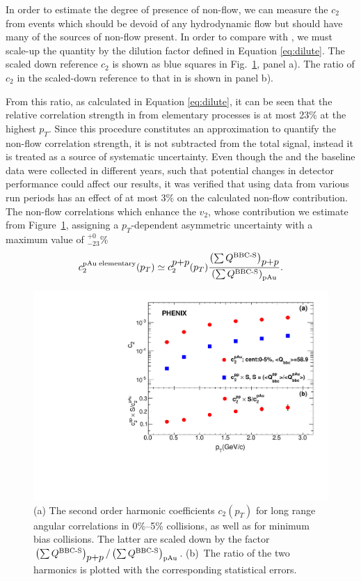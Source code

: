 In order to estimate the degree of presence of non-flow, we can measure the $c_2$ from \pp events which should be devoid of any hydrodynamic flow but should have many of the sources of non-flow present. In order to compare \pp with \pau, we must scale-up the \pp quantity by the dilution factor defined in Equation \ref{eq:dilute}. The scaled down reference $c_{2}$ is shown as blue squares in Fig.~\ref{fig:non_flow}, panel a). The ratio of $c_2$ in the scaled-down \pp reference to that in \pau is shown in panel b). 

From this ratio, as calculated in Equation \ref{eq:dilute}, it can be seen that the relative correlation strength in \pau from elementary processes is at most 23$\%$ at the highest $p_T$. Since this procedure constitutes an approximation to quantify the non-flow correlation strength, it is not subtracted from the total signal, instead it is treated as a source of systematic uncertainty. Even though the \pau and the \pp baseline data were collected in different years, such that potential changes in detector performance could affect our results, it was verified that using \pp data from various run periods has an effect of at most 3$\%$ on the calculated non-flow contribution. The non-flow correlations which enhance the $v_2$, whose contribution we estimate from Figure~\ref{fig:non_flow}, assigning a $p_T$-dependent asymmetric uncertainty with a maximum value of $^{+0}_{-23}\%$
\begin{equation}
c_{2}^{{\rm pAu \; elementary}}(p_{T}) \simeq c_{2}^{\mbox{$p$+$p$}}(p_{T})
\frac{\left( \sum Q^{{\rm \text{BBC-S}}} \right)_{\mbox{$p$+$p$}}}
{\left( \sum Q^{{\rm \text{BBC-S}}} \right)_{{\rm pAu}}}.
\label{eq:dilute}
\end{equation}

\begin{figure}[!h]
\begin{center}
\includegraphics[width=0.6\linewidth]{figs/non_flow.pdf}
\caption{(a) The second order harmonic coefficients $c_2(p_T)$ for long range angular correlations in
0\%--5\% \pau collisions, as well as for minimum bias \pp collisions. The latter are scaled down by the factor $\left( \sum Q^{{\rm \text{BBC-S}}} \right)_{\mbox{$p$+$p$}} / \left( \sum Q^{{\rm
\text{BBC-S}}} \right)_{{\rm pAu}}$. (b)~The
ratio of the two harmonics is plotted with the corresponding statistical errors.}
\label{fig:non_flow}
\end{center}
\end{figure}

